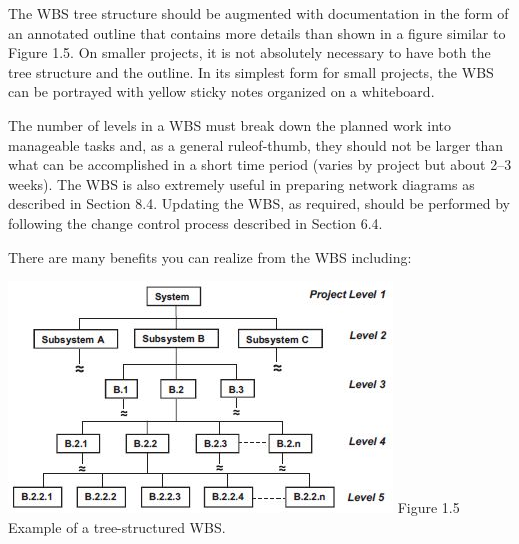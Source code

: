 \documentclass{book}
\begin{document}
\begin{multicols}{2}
The WBS tree structure should be augmented with documentation in the form of an annotated outline that contains
more details than shown in a figure similar to Figure 1.5. On
smaller projects, it is not absolutely necessary to have both
the tree structure and the outline. In its simplest form for
small projects, the WBS can be portrayed with yellow sticky
notes organized on a whiteboard.

The number of levels in a WBS must break down the
planned work into manageable tasks and, as a general ruleof-thumb, they should not be larger than what can be accomplished in a short time period (varies by project but about
2–3 weeks). The WBS is also extremely useful in preparing
network diagrams as described in Section 8.4. Updating the
WBS, as required, should be performed by following the
change control process described in Section 6.4.

There are many benefits you can realize from the WBS
including:

\includegraphics{Figure1.5}
Figure 1.5 Example of a tree-structured WBS.
 
 
\end{multicols}
\end{document}
